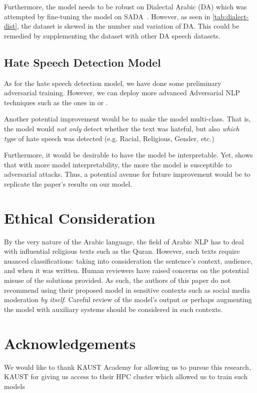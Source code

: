 \documentclass[10pt,twocolumn,letterpaper]{article}
\begin{document}
Furthermore, the model needs to be robust on Dialectal Arabic (DA) which
was attempted by fine-tuning the model on SADA~\cite{alowisheqSADASaudiAudio2023}. However, as seen in \cref{tab:dialect-dist}, the dataset is skewed in the number and variation of DA.
This could be remedied by supplementing the dataset with other DA speech datasets.
    

\subsection{Hate Speech Detection Model}

As for the hate speech detection model, we have done some preliminary adversarial training. However, we can deploy more advanced Adversarial NLP techniques such as the ones in \cite{pereiraALICEAdversarialTraining} or \cite{hartvigsenToxiGenLargeScaleMachineGenerated2022}.

Another potential improvement would be to make the model multi-class. That is, the model would \emph{not only} detect whether the text was hateful, but also \emph{which type} of hate speech was detected (e.g. Racial, Religious, Gender, etc.)

Furthermore, it would be desirable to have the model be interpretable. Yet, \cite{sabirInterpretabilityTransparencyDrivenDetection2023} shows that with more model interpretability, the more the model is susceptible to adversarial attacks. 
Thus, a potential avenue for future improvement would be to replicate the paper's results on our model.

\section{Ethical Consideration}

By the very nature of the Arabic language, the field of Arabic NLP has to deal with influential religious texts such as the Quran. 
However, such texts require nuanced classifications: taking into consideration the sentence's context, audience, and when it was written.
Human reviewers have raised concerns on the potential misuse of the solutions provided. As such, the authors of this paper do not recommend using their proposed model in sensitive contexts such as social media moderation \emph{by itself}. Careful review of the model's output or perhaps augmenting the model with auxiliary systems should be considered in such contexts.

\section{Acknowledgements}

We would like to thank KAUST Academy for allowing us to pursue this research, KAUST for giving us access to their HPC cluster which allowed us to train such models

\printbibliography{}
\end{document}
